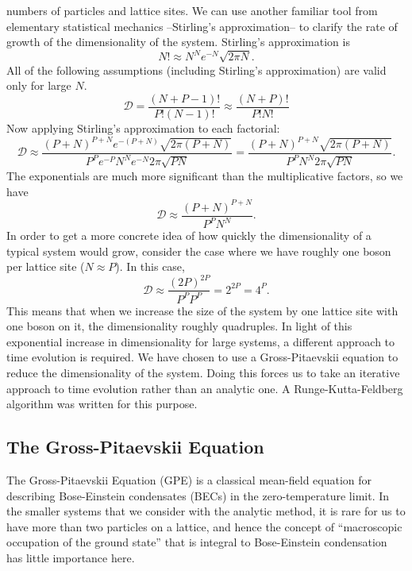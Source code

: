 \documentclass[a4paper, 10pt]{article}
\theoremstyle{plain}
\begin{document}
numbers of particles and lattice sites. We can use another familiar tool from
elementary statistical mechanics --Stirling's approximation-- to clarify the
rate of growth of the dimensionality of the system. Stirling's
approximation \cite{Schroeder2007} is
\begin{equation}
    N! \approx N^{N} e^{-N} \sqrt{2 \pi N}.
\end{equation}
All of the following assumptions (including Stirling's approximation) are
valid only for large $N$.
\begin{equation*}
    \mathcal{D} = \frac{(N + P - 1)!}{P! (N-1)!}
    \approx
    \frac{(N + P)!}{P! N!}
\end{equation*}
Now applying Stirling's approximation to each factorial:
\begin{equation*}
    \mathcal{D}
    \approx
    \frac{(P + N)^{P+N} e^{-(P + N)} \sqrt{2 \pi (P+N)}}
         {P^{P} e^{-P} N^{N} e^{-N} 2 \pi \sqrt{PN}}
    =
    \frac{(P + N)^{P+N} \sqrt{2 \pi (P+N)}}
         {P^{P} N^{N} 2\pi \sqrt{PN}}.
\end{equation*}
The exponentials are much more significant than the multiplicative factors, so
we have
\begin{equation*}
    \mathcal{D} \approx \frac{(P + N)^{P+N}}{P^P N^N}.
\end{equation*}
In order to get a more concrete idea of how quickly the dimensionality of a
typical system would grow, consider the case where we have roughly one boson
per lattice site ($N \approx P$). In this case,
\begin{equation*}
    \mathcal{D} \approx \frac{(2P)^{2P}}{P^{P} P^{P}} = 2^{2P} = 4^{P}.
\end{equation*}
This means that when we increase the size of the system by one lattice site with
one boson on it, the dimensionality roughly quadruples. In light of this
exponential increase in dimensionality for large systems, a different approach
to time evolution is required. We have chosen to use a Gross-Pitaevskii equation
to reduce the dimensionality of the system. Doing this forces us to take an
iterative approach to time evolution rather than an analytic one. A
Runge-Kutta-Feldberg algorithm \cite{Burden2005} was written for this purpose.


\subsection{The Gross-Pitaevskii Equation}

The Gross-Pitaevskii Equation (GPE) is a classical mean-field equation for
describing Bose-Einstein condensates (BECs) in the zero-temperature limit. In
the smaller systems that we consider with the analytic method, it is rare for us
to have more than two particles on a lattice, and hence the concept of
``macroscopic occupation of the ground state'' that is integral to Bose-Einstein
condensation has little importance here.
\end{document}

